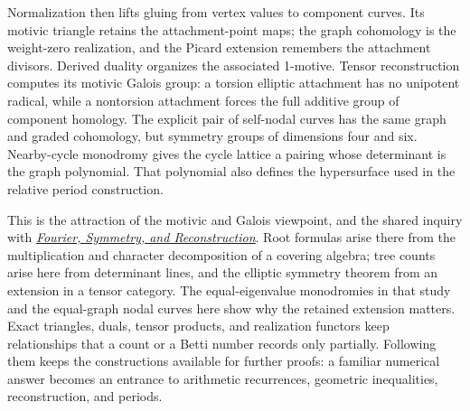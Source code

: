 \documentclass[11pt]{article}
\theoremstyle{definition}
\theoremstyle{remark}
\begin{document}
Normalization then lifts gluing from vertex values to component curves. Its motivic triangle retains the attachment-point maps; the graph cohomology is the weight-zero realization, and the Picard extension remembers the attachment divisors. Derived duality organizes the associated 1-motive. Tensor reconstruction computes its motivic Galois group: a torsion elliptic attachment has no unipotent radical, while a nontorsion attachment forces the full additive group of component homology. The explicit pair of self-nodal curves has the same graph and graded cohomology, but symmetry groups of dimensions four and six. Nearby-cycle monodromy gives the cycle lattice a pairing whose determinant is the graph polynomial. That polynomial also defines the hypersurface used in the relative period construction.

This is the attraction of the motivic and Galois viewpoint, and the shared inquiry with \href{https://tensorgami.com/notes/fourier-symmetry-and-reconstruction}{\emph{Fourier, Symmetry, and Reconstruction}}. Root formulas arise there from the multiplication and character decomposition of a covering algebra; tree counts arise here from determinant lines, and the elliptic symmetry theorem from an extension in a tensor category. The equal-eigenvalue monodromies in that study and the equal-graph nodal curves here show why the retained extension matters. Exact triangles, duals, tensor products, and realization functors keep relationships that a count or a Betti number records only partially. Following them keeps the constructions available for further proofs: a familiar numerical answer becomes an entrance to arithmetic recurrences, geometric inequalities, reconstruction, and periods.
\end{document}
